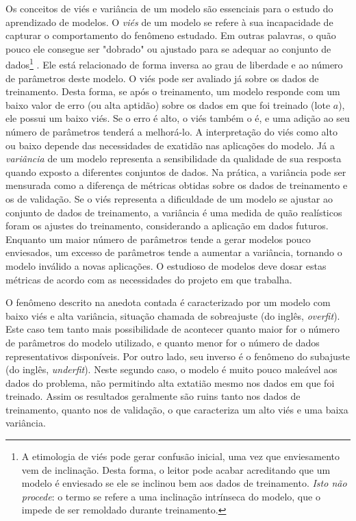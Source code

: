       Os conceitos de viés e variância de um modelo são essenciais para o estudo do aprendizado de modelos. O \emph{viés} de um modelo se refere à sua incapacidade de capturar o comportamento do fenômeno estudado. Em outras palavras, o quão pouco ele consegue ser "dobrado" ou ajustado para se adequar ao conjunto de dados\footnote{A etimologia de viés pode gerar confusão inicial, uma vez que enviesamento vem de inclinação. Desta forma, o leitor pode acabar acreditando que um modelo é enviesado se ele se inclinou bem aos dados de treinamento. \emph{Isto não procede}: o termo se refere a uma inclinação intrínseca do modelo, que o impede de ser remoldado durante treinamento.}
      .
      Ele está relacionado de forma inversa ao grau de liberdade e ao número de parâmetros deste modelo. O viés pode ser avaliado já sobre os dados de treinamento. Desta forma, se após o treinamento, um modelo responde com um baixo valor de erro (ou alta aptidão) sobre os dados em que foi treinado (lote $a$), ele possui um baixo viés. Se o erro é alto, o viés também o é, e uma adição ao seu número de parâmetros tenderá a melhorá-lo. A interpretação do viés como alto ou baixo depende das necessidades de exatidão nas aplicações do modelo. Já a \emph{variância} de um modelo representa a sensibilidade da qualidade de sua resposta quando exposto a diferentes conjuntos de dados. Na prática, a variância pode ser mensurada como a diferença de métricas obtidas sobre os dados de treinamento e os de validação. Se o viés representa a dificuldade de um modelo se ajustar ao conjunto de dados de treinamento, a variância é uma medida de quão realísticos foram os ajustes do treinamento, considerando a aplicação em dados futuros. Enquanto um maior número de parâmetros tende a gerar modelos pouco enviesados, um excesso de parâmetros tende a aumentar a variância, tornando o modelo inválido a novas aplicações. O estudioso de modelos deve dosar estas métricas de acordo com as necessidades do projeto em que trabalha.

      O fenômeno descrito na anedota contada é caracterizado por um modelo com baixo viés e alta variância, situação chamada de sobreajuste (do inglês, \textit{overfit}). Este caso tem tanto mais possibilidade de acontecer quanto maior for o número de parâmetros do modelo utilizado, e quanto menor for o número de dados representativos disponíveis. Por outro lado, seu inverso é o fenômeno do subajuste (do inglês, \textit{underfit}). Neste segundo caso, o modelo é muito pouco maleável aos dados do problema, não permitindo alta extatião mesmo nos dados em que foi treinado. Assim os resultados geralmente são ruins tanto nos dados de treinamento, quanto nos de validação, o que caracteriza um alto viés e uma baixa variância.

